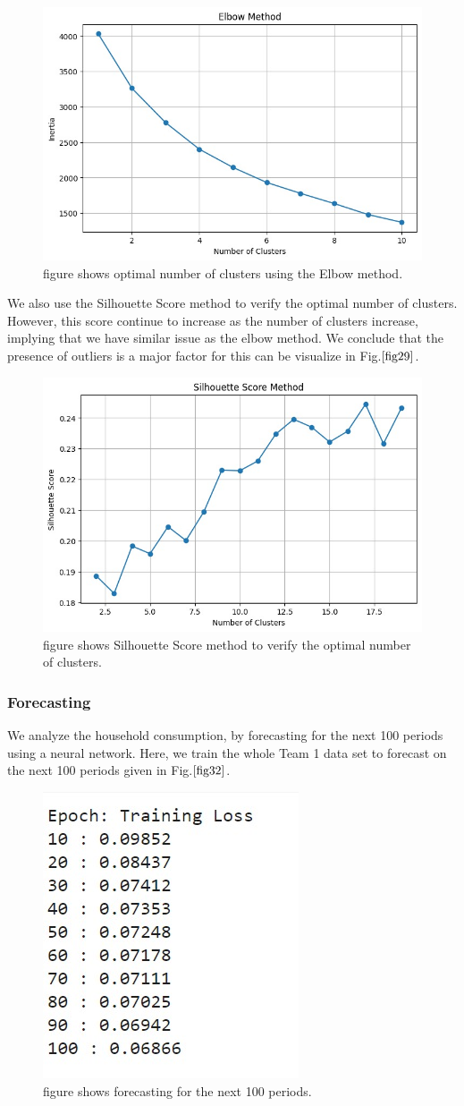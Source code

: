 \documentclass[english,12pt, titlepage]{article}
\begin{document}
	
	\begin{figure}[!ht]
		\centering
		\includegraphics[width=0.5\linewidth]{fig21.jpeg}
		\caption{figure shows optimal number of clusters using the Elbow method.}\label{fig28}
	\end{figure}
	
	
	We also use the Silhouette Score method to verify the optimal number of clusters. However, this score continue to increase as the number of clusters increase, implying that we have similar issue as the elbow method. We conclude that the presence of outliers is a major factor for this can be visualize in Fig.$\ref{fig29}$.
	
	\begin{figure}[!ht]
		\centering
		\includegraphics[width=0.5\linewidth]{fig22.jpeg}
		\caption{figure shows Silhouette Score method to verify the optimal number of clusters.}\label{fig29}
	\end{figure}
	
	\subsubsection{Forecasting}
	
	We analyze the household consumption, by forecasting for the next 100 periods using a neural network. Here, we train the whole Team 1 data set to forecast on the next 100 periods given in Fig.$\ref{fig32}$.
	
	\begin{figure}[!ht]
		\centering
		\includegraphics[width=0.25\linewidth]{fig23.jpeg}
		\caption{figure shows forecasting for the next 100 periods.}\label{fig32}
	\end{figure}
	
\end{document}
